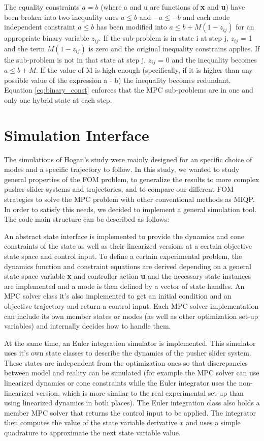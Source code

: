 \documentclass[12,twoside]{TFG-GM}
\theoremstyle{definition}
\theoremstyle{remark}
\begin{document}
The equality constraints $a = b$ (where a and u are functions of \textbf{x} and \textbf{u}) have been broken into two inequality ones $a \leq b$ and $-a \leq -b$ and each mode independent constraint $a \leq b$ has been modified into $a \leq b + M(1 - z_{ij})$ for an appropriate binary variable $z_{ij}$. If the sub-problem is in state i at step j, $z_{ij}$ = 1 and the term $M(1 - z_{ij})$ is zero and the original inequality constrains applies. If the sub-problem is not in that state at step j, $z_{ij}$ = 0 and the inequality becomes $a \leq b + M$. If the value of M is high enough (specifically, if it is higher than any possible value of the expression a - b) the inequality becomes redundant. Equation \ref{eq:binary_const} enforces that the MPC sub-problems are in one and only one hybrid state at each step.

\section{Simulation Interface}
\label{sec:sim}

The simulations of Hogan's study were mainly designed for an specific choice of modes and a specific trajectory to follow. In this study, we wanted to study general properties of the FOM problem, to generalize the results to more complex pusher-slider systems and trajectories, and to compare our different FOM strategies to solve the MPC problem with other conventional methods as MIQP. In order to satisfy this needs, we decided to implement a general simulation tool. The code main structure can be described as follows:

An abstract state interface is implemented to provide the dynamics and cone constraints of the state as well as their linearized versions at a certain objective state space and control input. To define a certain experimental problem, the dynamics function and constraint equations are derived depending on a general state space variable \textbf{x} and controller action \textbf{u} and the necessary state instances are implemented and a mode is then defined by a vector of state handles. An MPC solver class it's also implemented to get an initial condition and an objective trajectory and return a control input. Each MPC solver implementation can include its own member states or modes (as well as other optimization set-up variables) and internally decides how to handle them.

At the same time, an Euler integration simulator is implemented. This simulator uses it's own state classes to describe the dynamics of the pusher slider system. These states are independent from the optimization ones so that discrepancies between model and reality can be simulated (for example the MPC solver can use linearized dynamics or cone constraints while the Euler integrator uses the non-linearized version, which is more similar to the real experimental set-up than using linearized dynamics in both places). The Euler integration class also holds a member MPC solver that returns the control input to be applied. The integrator then computes the value of the state variable derivative $\dot{x}$ and uses a simple quadrature to approximate the next state variable value.
\end{document}
